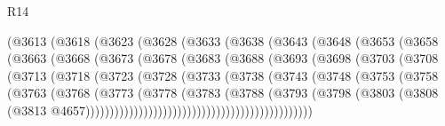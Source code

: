\begin{lexlean}{R14}
\begin{coremodule}
{{{{{{{{{{{{{{{{{{{{{{{{{{{{{{{{{{{{{{{{{{{{{{{{{{{{{{{{{{{{{{{{{{{{{{{{{{{{{{{{{{                (@3613
                  (@3618
                    (@3623
                      (@3628
                        (@3633
                          (@3638
                            (@3643
                              (@3648
                                (@3653
                                  (@3658
                                    (@3663
                                      (@3668
                                        (@3673
                                          (@3678
                                            (@3683
                                              (@3688
                                                (@3693
                                                  (@3698
                                                    (@3703
                                                      (@3708
                                                        (@3713
                                                          (@3718
                                                            (@3723
                                                              (@3728
                                                                (@3733
                                                                  (@3738
                                                                    (@3743
                                                                      (@3748
                                                                        (@3753
                                                                          (@3758
                                                                            (@3763
                                                                              (@3768
                                                                                (@3773
                                                                                  (@3778
                                                                                    (@3783
                                                                                      (@3788
                                                                                        (@3793
                                                                                          (@3798
                                                                                            (@3803
                                                                                              (@3808
                                                                                                (@3813
                                                                                                  @4657)))))))))))))))))))))))))))))))))))))))))))))))
}}}}}}}}}}}}}}}}}}}}}}}}}}}}}}}}}}}}}}}}}}}}}}}}}}}}}}}}}}}}}}}}}}}}}}}}}}}}}}}}}}
\end{coremodule}
\end{lexlean}
